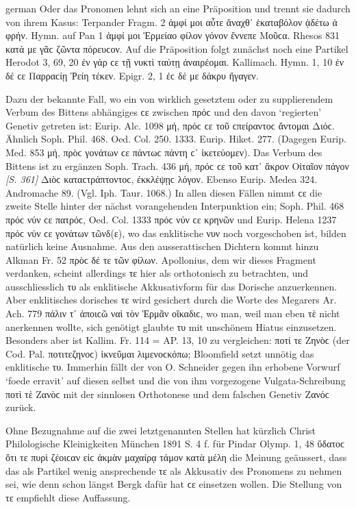 \begin{otherlanguage*}{german}
Oder das Pronomen lehnt sich an eine Präposition und trennt sie dadurch von ihrem Kasus: Terpander Fragm. 2 ἀμφί μοι αὖτε ἄναχθ᾽ ἑκαταβόλον ᾀδέτω ἁ φρήν. Hymn. auf Pan 1 ἀμφί μοι Ἑρμείαο φίλον γόνον ἔννεπε Μοῦϲα. Rhesos 831 κατά με γᾶϲ ζῶντα πόρευϲον. Auf die Präposition folgt zunächst noch eine Partikel Herodot 3, 69, 20 ἐν γάρ ϲε τῇ νυκτὶ ταύτῃ ἀναιρέομαι. Kallimach. Hymn. 1, 10 ἐν δέ ϲε Παρραϲίῃ Ῥείη τέκεν. Epigr. 2, 1 ἐϲ δέ με δάκρυ ἤγαγεν.

Dazu der bekannte Fall, wo ein von wirklich gesetztem oder zu supplierendem Verbum des Bittens abhängiges ϲε zwischen πρόϲ und den davon ‘regierten’ Genetiv getreten ist: Eurip. Alc. 1098 μή, πρόϲ ϲε τοῦ ϲπείραντοϲ ἄντομαι Διόϲ. Ähnlich Soph. Phil. 468. Oed. Col. 250. 1333. Eurip. Hiket. 277. (Dagegen Eurip. Med. 853 μή, πρὸϲ γονάτων ϲε πάντωϲ πάντη ϲ᾽ ἱκετεύομεν). Das Verbum des Bittens ist zu ergänzen Soph. Trach. 436 μή, πρόϲ ϲε τοῦ κατ᾽ ἄκρον Οἰταῖον πάγον \hypertarget{p361}{\emph{[S. 361]}}\label{p361} Διὸϲ καταϲτράπτοντοϲ, ἐκκλέψῃϲ λόγον. Ebenso Eurip. Medea 324. Andromache 89. (Vgl. Iph. Taur. 1068.) In allen diesen Fällen nimmt ϲε die zweite Stelle hinter der nächst vorangehenden Interpunktion ein; Soph. Phil. 468 πρόϲ νύν ϲε πατρόϲ, Oed. Col. 1333 πρόϲ νύν ϲε κρηνῶν und Eurip. Helena 1237 πρόϲ νύν ϲε γονάτων τῶνδ(ε), wo das enklitische νυν noch vorgeschoben ist, bilden natürlich keine Ausnahme. Aus den ausserattischen Dichtern kommt hinzu Alkman Fr. 52 πρὸϲ δέ τε τῶν φίλων. Apollonius, dem wir dieses Fragment verdanken, scheint allerdings τε hier als orthotonisch zu betrachten, und ausschliesslich τυ als enklitische Akkusativform für das Dorische anzuerkennen. Aber enklitisches dorisches τε wird gesichert durch die Worte des Megarers Ar. Ach. 779 πάλιν τ᾽ ἀποιϲῶ ναὶ τὸν Ἑρμᾶν οἴκαδιϲ, wo man, weil man eben τὲ nicht anerkennen wollte, sich genötigt glaubte τυ mit unschönem Hiatus einzusetzen. Besonders aber ist Kallim. Fr. 114 = AP. 13, 10 zu vergleichen: ποτί τε Ζηνὸϲ (der Cod. Pal. ποτιτεζηνοϲ) ἱκνεῦμαι λιμενοϲκόπω; Bloomfield setzt unnötig das enklitische τυ. Immerhin fällt der von O. Schneider gegen ihn erhobene Vorwurf ‘foede erravit’ auf diesen selbst und die von ihm vorgezogene Vulgata-Schreibung ποτὶ τὲ Ζανὸϲ mit der sinnlosen Orthotonese und dem falschen Genetiv Ζανόϲ zurück.

Ohne Bezugnahme auf die zwei letztgenannten Stellen hat kürzlich Christ Philologische Kleinigkeiten München 1891 S. 4 f. für Pindar Olymp. 1, 48 ὕδατοϲ ὅτι τε πυρὶ ζέοιϲαν εἰϲ ἀκμὰν μαχαίρᾳ τάμον κατὰ μέλη die Meinung geäussert, dass das als Partikel wenig ansprechende τε als Akkusativ des Pronomens zu nehmen sei, wie denn schon längst Bergk dafür hat ϲε einsetzen wollen. Die Stellung von τε empfiehlt diese Auffassung.


\end{otherlanguage*}

